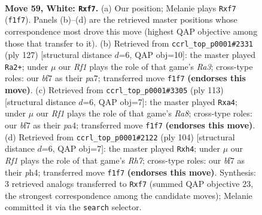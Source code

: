 \documentclass[11pt]{article}
\begin{document}
\clearpage

\begin{figure}[p]\centering
\begin{subfigure}{0.46\textwidth}\centering
\resizebox{\linewidth}{!}{%
\newchessgame
\chessboard[
  setfen={2k5/5b2/2P5/8/8/2r5/7K/5R2 w - - 0 59},
  showmover=false,
  pgfstyle=straightmove, color=movearrow, markmove={f1-f7}
]}
\caption{}
\end{subfigure}\hfill
\begin{subfigure}{0.46\textwidth}\centering
\resizebox{\linewidth}{!}{%
\newchessgame
\chessboard[
  setfen={8/P7/r7/8/8/2k4p/7K/4R3 b - - 0 64},
  showmover=false,
  pgfstyle=straightmove, color=movearrow, markmove={a6-a2}
]}
\caption{}
\end{subfigure}
\\[4pt]
\begin{subfigure}{0.46\textwidth}\centering
\resizebox{\linewidth}{!}{%
\newchessgame
\chessboard[
  setfen={8/7k/4R3/8/P7/7p/7K/r7 b - - 7 57},
  showmover=false,
  pgfstyle=straightmove, color=movearrow, markmove={a1-a4}
]}
\caption{}
\end{subfigure}\hfill
\begin{subfigure}{0.46\textwidth}\centering
\resizebox{\linewidth}{!}{%
\newchessgame
\chessboard[
  setfen={8/7R/r7/5k2/5P1p/8/3K4/8 w - - 13 53},
  showmover=false,
  pgfstyle=straightmove, color=movearrow, markmove={h7-h4}
]}
\caption{}
\end{subfigure}
\caption{\textbf{Move 59, White: \texttt{Rxf7}.} (a) Our position; Melanie plays \texttt{Rxf7} (\texttt{f1f7}). Panels (b)--(d) are the retrieved master positions whose correspondence most drove this move (highest QAP objective among those that transfer to it). (b) Retrieved from \texttt{ccrl\_top\_p0001\#2331} (ply 127) [structural distance $d$=6, QAP obj=10]: the master played \texttt{Ra2+}; under $\mu$ our \emph{Rf1} plays the role of that game's \emph{Ra3}; cross-type roles: our \emph{b}f7 as their \emph{p}a7; transferred move \texttt{f1f7} \textbf{(endorses this move)}. (c) Retrieved from \texttt{ccrl\_top\_p0001\#3305} (ply 113) [structural distance $d$=6, QAP obj=7]: the master played \texttt{Rxa4}; under $\mu$ our \emph{Rf1} plays the role of that game's \emph{Ra8}; cross-type roles: our \emph{b}f7 as their \emph{p}a4; transferred move \texttt{f1f7} \textbf{(endorses this move)}. (d) Retrieved from \texttt{ccrl\_top\_p0001\#2122} (ply 104) [structural distance $d$=6, QAP obj=7]: the master played \texttt{Rxh4}; under $\mu$ our \emph{Rf1} plays the role of that game's \emph{Rh7}; cross-type roles: our \emph{b}f7 as their \emph{p}h4; transferred move \texttt{f1f7} \textbf{(endorses this move)}. Synthesis: 3 retrieved analogs transferred to \texttt{Rxf7} (summed QAP objective 23, the strongest correspondence among the candidate moves); Melanie committed it via the \texttt{search} selector.}
\label{fig:thought-m116}
\end{figure}
\end{document}
